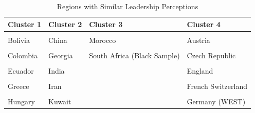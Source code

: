 \documentclass[
]{article}
\begin{document}
\begin{table}[ht]

\caption{\label{tab:country_table}Regions with Similar Leadership Perceptions}
\centering
\begin{tabular}[t]{>{}l>{}l>{}l>{}l}
\toprule
Cluster 1 & Cluster 2 & Cluster 3 & Cluster 4\\
\midrule
\textcolor[HTML]{739999}{\cellcolor{gray!6}{Argentina}} & \textcolor[HTML]{000026}{\cellcolor{gray!6}{Albania}} & \textcolor[HTML]{407326}{\cellcolor{gray!6}{France}} & \textcolor[HTML]{BF7300}{\cellcolor{gray!6}{Australia}}\\
\textcolor[HTML]{739999}{Bolivia} & \textcolor[HTML]{000026}{China} & \textcolor[HTML]{407326}{Morocco} & \textcolor[HTML]{BF7300}{Austria}\\
\textcolor[HTML]{739999}{\cellcolor{gray!6}{Brazil}} & \textcolor[HTML]{000026}{\cellcolor{gray!6}{Egypt}} & \textcolor[HTML]{407326}{\cellcolor{gray!6}{Qatar}} & \textcolor[HTML]{BF7300}{\cellcolor{gray!6}{Canada (English-speaking)}}\\
\textcolor[HTML]{739999}{Colombia} & \textcolor[HTML]{000026}{Georgia} & \textcolor[HTML]{407326}{South Africa (Black Sample)} & \textcolor[HTML]{BF7300}{Czech Republic}\\
\textcolor[HTML]{739999}{\cellcolor{gray!6}{Costa Rica}} & \textcolor[HTML]{000026}{\cellcolor{gray!6}{Hong Kong}} & \textcolor[HTML]{407326}{\cellcolor{gray!6}{}} & \textcolor[HTML]{BF7300}{\cellcolor{gray!6}{Denmark}}\\
\addlinespace
\textcolor[HTML]{739999}{Ecuador} & \textcolor[HTML]{000026}{India} & \textcolor[HTML]{407326}{} & \textcolor[HTML]{BF7300}{England}\\
\textcolor[HTML]{739999}{\cellcolor{gray!6}{El Salvador}} & \textcolor[HTML]{000026}{\cellcolor{gray!6}{Indonesia}} & \textcolor[HTML]{407326}{\cellcolor{gray!6}{}} & \textcolor[HTML]{BF7300}{\cellcolor{gray!6}{Finland}}\\
\textcolor[HTML]{739999}{Greece} & \textcolor[HTML]{000026}{Iran} & \textcolor[HTML]{407326}{} & \textcolor[HTML]{BF7300}{French Switzerland}\\
\textcolor[HTML]{739999}{\cellcolor{gray!6}{Guatemala}} & \textcolor[HTML]{000026}{\cellcolor{gray!6}{Japan}} & \textcolor[HTML]{407326}{\cellcolor{gray!6}{}} & \textcolor[HTML]{BF7300}{\cellcolor{gray!6}{Germany (EAST)}}\\
\textcolor[HTML]{739999}{Hungary} & \textcolor[HTML]{000026}{Kuwait} & \textcolor[HTML]{407326}{} & \textcolor[HTML]{BF7300}{Germany (WEST)}\\

\end{tabular}
\end{table}
\end{document}
